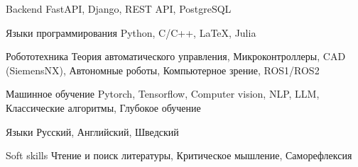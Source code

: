 

\begin{cvskills}

  \cvskill
    {Backend} %
    {FastAPI, Django, REST API, PostgreSQL} %

  \cvskill
    {Языки программирования} %
    {Python, C/C++, LaTeX, Julia} %

  \cvskill
    {Робототехника} %
    {Теория автоматического управления, Микроконтроллеры, CAD (SiemensNX), } %
  \cvskill
    {} %
    {Автономные роботы, Компьютерное зрение, ROS1/ROS2} %

  \cvskill
    {Машинное обучение}
    {Pytorch, Tensorflow, Computer vision, NLP, LLM, Классические алгоритмы, Глубокое обучение}

  \cvskill
    {Языки} %
    {Русский, Английский, Шведский} %

  \cvskill
    {Soft skills} %
    {Чтение и поиск литературы, Критическое мышление, Саморефлексия} %

\end{cvskills}
